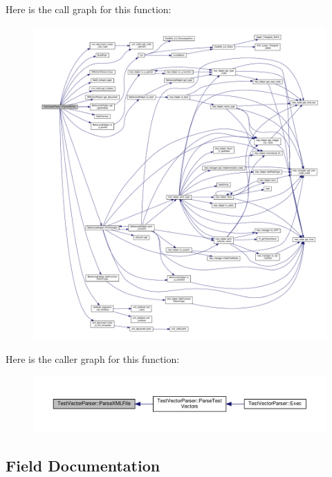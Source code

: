 Here is the call graph for this function\+:
\nopagebreak
\begin{figure}[H]
\begin{center}
\leavevmode
\includegraphics[width=350pt]{d8/d4e/classTestVectorParser_a0509f3e5b9c496651e6d896ce8d099c0_cgraph}
\end{center}
\end{figure}
Here is the caller graph for this function\+:
\nopagebreak
\begin{figure}[H]
\begin{center}
\leavevmode
\includegraphics[width=350pt]{d8/d4e/classTestVectorParser_a0509f3e5b9c496651e6d896ce8d099c0_icgraph}
\end{center}
\end{figure}


\subsection{Field Documentation}
\mbox{\label{classTestVectorParser_a8bf0baf83cbbb5e93694f1cb89059fbd}} 
